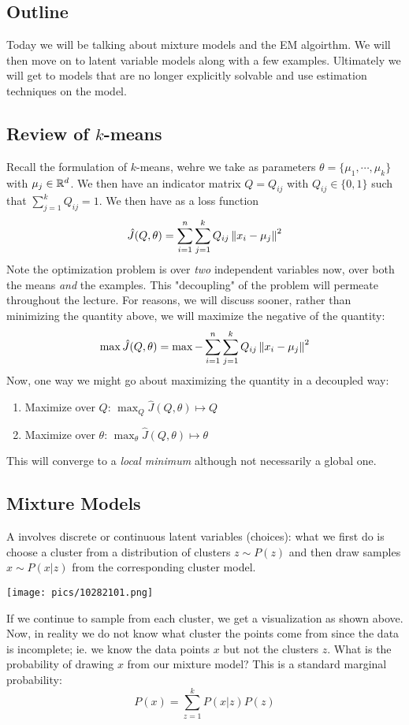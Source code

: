 \documentclass[11pt]{scrartcl}
\begin{document}
\subsection{Outline}
Today we will be talking about mixture models and the EM algoirthm. We will then move on to latent variable models along with a few examples. Ultimately we will get to models that are no longer explicitly solvable and use estimation techniques on the model. 

\subsection{Review of $k$-means}
Recall the formulation of $k$-means, wehre we take as parameters $\theta=\{\mu_1,\cdots,\mu_k\}$ with $\mu_j \in \mathbb{R}^{d}$. We then have an indicator matrix $Q=Q_{ij}$ with $Q_{ij} \in \{0,1\}$ such that $\sum_{j=1}^{k}Q_{ij}=1$. We then have as a loss function 
$$\hat{J}(Q,\theta)=\sum_{i=1}^{n}\sum_{j=1}^{k} Q_{ij} \left\lVert x_i-\mu_j\right\rVert^2$$
Note the optimization problem is over \textit{two} independent variables now, over both the means \textit{and} the examples. This "decoupling" of the problem will permeate throughout the lecture. For reasons, we will discuss sooner, rather than minimizing the quantity above, we will maximize the negative of the quantity:
$$\max \hat{J}(Q,\theta)=\max -\sum_{i=1}^{n}\sum_{j=1}^{k} Q_{ij} \left\lVert x_i-\mu_j\right\rVert^2 $$
Now, one way we might go about maximizing the quantity in a decoupled way:
\begin{enumerate}[label=(\roman*)]
    \item Maximize over $Q$: $\max_{Q} \hat{J}(Q,\theta) \mapsto Q$
    \item Maximize over $\theta$: $\max_{\theta} \hat{J}(Q,\theta) \mapsto \theta$
\end{enumerate}

This will converge to a \textit{local minimum} although not necessarily a global one. 

\subsection{Mixture Models}

A  involves discrete or continuous latent variables (choices): what we first do is choose a cluster from a distribution of clusters $z \sim P(z)$ and then draw samples $x \sim P(x|z)$ from the corresponding cluster model.
\begin{center}
    \texttt{[image: pics/10282101.png]}
\end{center}
If we continue to sample from each cluster, we get a visualization as shown above. Now, in reality we do not know what cluster the points come from since the data is incomplete; ie. we know the data points $x$ but not the clusters $z$. What is the probability of drawing $x$ from our mixture model? This is a standard marginal probability: $$P(x)=\sum_{z=1}^{k}P(x|z)P(z)$$
\end{document}
